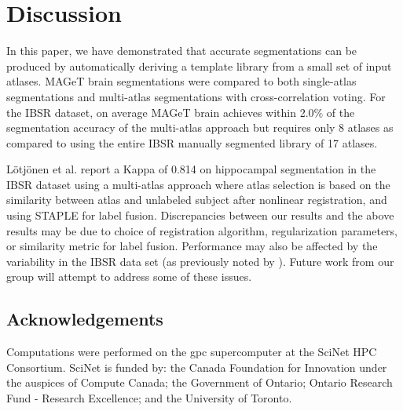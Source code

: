 \documentclass{article}\usepackage{graphicx, color}
\begin{document}
\section{Discussion}

In this paper, we have demonstrated that accurate segmentations can be produced
by automatically deriving a template library from a small set of input atlases.
MAGeT brain segmentations were compared to both single-atlas segmentations and
multi-atlas segmentations with cross-correlation voting.  For the IBSR dataset,
on average MAGeT brain achieves within 2.0\% of the segmentation accuracy of
the multi-atlas approach but requires only 8 atlases as compared to using the
entire IBSR manually segmented library of 17 atlases.

L\"{o}tj\"{o}nen et al.\cite{Lotjonen2010} report a Kappa of 0.814 on
hippocampal segmentation in the IBSR dataset using a multi-atlas approach where
atlas selection is based on the similarity between atlas and unlabeled subject
after nonlinear registration, and using STAPLE\cite{Warfield2004} for label
fusion.  Discrepancies between our results and the above results may be due to
choice of registration algorithm, regularization parameters, or similarity
metric for label fusion.  Performance may also be affected by the variability
in the IBSR data set (as previously noted by \cite{Klein2009}).  Future work
from our group will attempt to address some of these issues.

\subsection{Acknowledgements}
Computations were performed on the gpc supercomputer at the SciNet HPC
Consortium\cite{Loken2010}. SciNet is funded by: the Canada Foundation for
Innovation under the auspices of Compute Canada; the Government of Ontario;
Ontario Research Fund - Research Excellence; and the University of Toronto.



\end{document}
